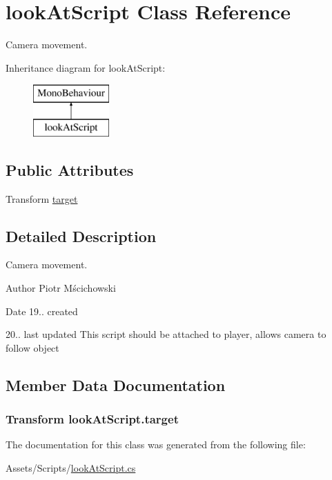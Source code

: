 \hypertarget{classlook_at_script}{}\section{look\+At\+Script Class Reference}
\label{classlook_at_script}


Camera movement.  


Inheritance diagram for look\+At\+Script\+:\begin{figure}[H]
\begin{center}
\leavevmode
\includegraphics[height=2.000000cm]{classlook_at_script}
\end{center}
\end{figure}
\subsection*{Public Attributes}
\begin{DoxyCompactItemize}
\item 
Transform \hyperlink{classlook_at_script_a3b70e47b1a08454438cd971a9e752a70}{target}
\end{DoxyCompactItemize}


\subsection{Detailed Description}
Camera movement. 

\begin{DoxyAuthor}{Author}
Piotr Mścichowski 
\end{DoxyAuthor}
\begin{DoxyDate}{Date}
19.. created 

20.. last updated This script should be attached to player, allows camera to follow object 
\end{DoxyDate}


\subsection{Member Data Documentation}
\hypertarget{classlook_at_script_a3b70e47b1a08454438cd971a9e752a70}{}
\subsubsection[{target}]{\setlength{\rightskip}{0pt plus 5cm}Transform look\+At\+Script.\+target}\label{classlook_at_script_a3b70e47b1a08454438cd971a9e752a70}


The documentation for this class was generated from the following file\+:\begin{DoxyCompactItemize}
\item 
Assets/\+Scripts/\hyperlink{look_at_script_8cs}{look\+At\+Script.\+cs}\end{DoxyCompactItemize}
